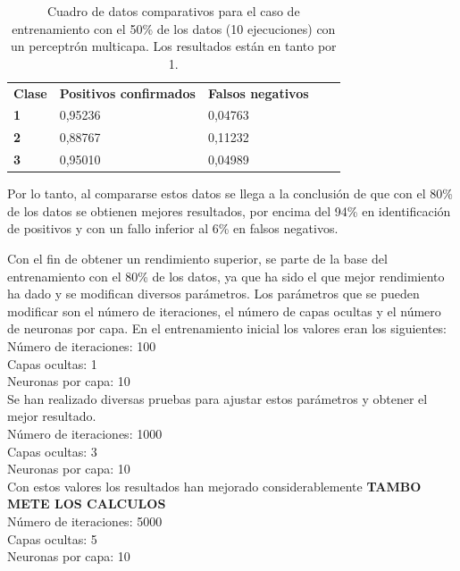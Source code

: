\documentclass[10pt,a4paper]{article}
\begin{document}
\begin{table}[h!]
\centering
\begin{tabular}{|l|l|l|ll}
\cline{1-3}
\multicolumn{1}{|c|}{\textbf{Clase}} & \multicolumn{1}{c|}{\textbf{Positivos confirmados}} & \multicolumn{1}{c|}{\textbf{Falsos negativos}} & \multicolumn{1}{c}{\textbf{}} &  \\ \cline{1-3}
\textbf{1}                       &         0,95236                       &       0,04763                         &                               &  \\ \cline{1-3}
\textbf{2}                       &         0,88767 
&       0,11232 
&                               &  \\ \cline{1-3}
\textbf{3}                       &         0,95010                       &       0,04989 &                               &  \\ \cline{1-3}
\end{tabular}
\caption{Cuadro de datos comparativos para el caso de entrenamiento con el 50\%{} de los datos (10 ejecuciones) con un perceptrón multicapa. Los resultados están en tanto por 1.}
\label{tab:ej5_20porcent}
\end{table}

Por lo tanto, al compararse estos datos se llega a la conclusión de que con el 80\%{} de los datos se obtienen mejores resultados, por encima del 94\%{} en identificación de positivos y con un fallo inferior al 6\%{} en falsos negativos.

Con el fin de obtener un rendimiento superior, se parte de la base del entrenamiento con el 80\% de los datos, ya que ha sido el que mejor rendimiento ha dado y se modifican diversos parámetros. Los parámetros que se pueden modificar son el número de iteraciones, el número de capas ocultas y el número de neuronas por capa. En el entrenamiento inicial los valores eran los siguientes: \\
Número de iteraciones: 100 \\
Capas ocultas: 1  \\
Neuronas por capa: 10\\ 

Se han realizado diversas pruebas para ajustar estos parámetros y obtener el mejor resultado.\\
Número de iteraciones: 1000 \\
Capas ocultas: 3  \\
Neuronas por capa: 10 \\ 

Con estos valores los resultados han mejorado considerablemente
\textbf{TAMBO METE LOS CALCULOS}\\
Número de iteraciones: 5000 \\
Capas ocultas: 5  \\
Neuronas por capa: 10 \\ 
\end{document}
